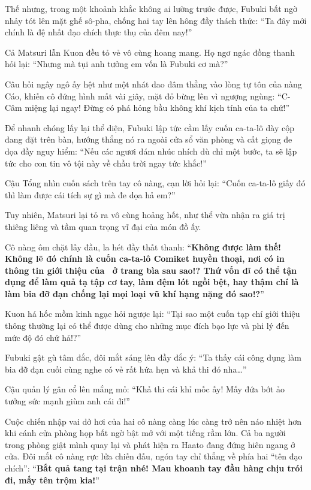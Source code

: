 \documentclass[../main.tex]{subfiles}
\begin{document}
Thế nhưng, trong một khoảnh khắc không ai lường trước được, Fubuki bất ngờ nhảy tót lên mặt ghế sô-pha, chống hai tay lên hông đầy thách thức:
``Ta đây mới chính là đệ nhất đạo chích thực thụ của đêm nay!''

Cả Matsuri lẫn Kuon đều tỏ vẻ vô cùng hoang mang. Họ ngơ ngác đồng thanh hỏi lại:
``Nhưng mà tụi anh tưởng em vốn là Fubuki cơ mà?''

Câu hỏi ngây ngô ấy hệt như một nhát dao đâm thẳng vào lòng tự tôn của nàng Cáo, khiến cô đứng hình mất vài giây, mặt đỏ bừng lên vì ngượng ngùng:
``C-Câm miệng lại ngay! Đừng có phá hỏng bầu không khí kịch tính của ta chứ!''

Để nhanh chóng lấy lại thể diện, Fubuki lập tức cầm lấy cuốn ca-ta-lô dày cộp đang đặt trên bàn, hướng thẳng nó ra ngoài cửa sổ văn phòng và cất giọng đe dọa đầy nguy hiểm:
``Nếu các ngươi dám nhúc nhích dù chỉ một bước, ta sẽ lập tức cho con tin vô tội này về chầu trời ngay tức khắc!''

Cậu Tổng nhìn cuốn sách trên tay cô nàng, cạn lời hỏi lại:
``Cuốn ca-ta-lô giấy đó thì làm được cái tích sự gì mà đe dọa hả em?''

Tuy nhiên, Matsuri lại tỏ ra vô cùng hoảng hốt, như thể vừa nhận ra giá trị thiêng liêng và tầm quan trọng vĩ đại của món đồ ấy.


Cô nàng ôm chặt lấy đầu, la hét đầy thất thanh:
``\textbf{Không được làm thế! Không lẽ đó chính là cuốn ca-ta-lô Comiket huyền thoại, nơi có in thông tin giới thiệu của \hll\ ở trang bìa sau sao!? Thứ vốn dĩ có thể tận dụng để làm quả tạ tập cơ tay, làm đệm lót ngồi bệt, hay thậm chí là làm bia đỡ đạn chống lại mọi loại vũ khí hạng nặng đó sao!?}''

Kuon há hốc mồm kinh ngạc hỏi ngược lại:
``Tại sao một cuốn tạp chí giới thiệu thông thường lại có thể được dùng cho những mục đích bạo lực và phi lý đến mức độ đó chứ hả!?''

Fubuki gật gù tâm đắc, đôi mắt sáng lên đầy đắc ý:
``Ta thấy cái công dụng làm bia đỡ đạn cuối cùng nghe có vẻ rất hứa hẹn và khả thi đó nha\dots''

Cậu quản lý gân cổ lên mắng mỏ:
``Khả thi cái khỉ mốc ấy! Mấy đứa bớt ảo tưởng sức mạnh giùm anh cái đi!''

Cuộc chiến nhập vai dở hơi của hai cô nàng càng lúc càng trở nên náo nhiệt hơn khi cánh cửa phòng họp bất ngờ bật mở với một tiếng rầm lớn. Cả ba người trong phòng giật mình quay lại và phát hiện ra Haato đang đứng hiên ngang ở cửa. Đôi mắt cô nàng rực lửa chiến đấu, ngón tay chỉ thẳng về phía hai ``tên đạo chích'':
``\textbf{Bắt quả tang tại trận nhé! Mau khoanh tay đầu hàng chịu trói đi, mấy tên trộm kia!}''
\end{document}
